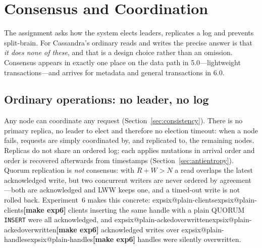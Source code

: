 \providecommand{\expsix}[1]{\ifcsname expsix@#1\endcsname\csname expsix@#1\endcsname\else\textbf{[make exp6]}\fi}
\providecommand{\expfault}[1]{\ifcsname expfault@#1\endcsname\csname expfault@#1\endcsname\else\textbf{[make figures]}\fi}

\section{Consensus and Coordination}\label{sec:consensus}

The assignment asks how the system elects leaders, replicates a log and prevents split-brain.
For Cassandra's ordinary reads and writes the precise answer is that \emph{it does none of
these}, and that is a design choice rather than an omission. Consensus appears in exactly one
place on the data path in 5.0---lightweight transactions---and arrives for metadata and
general transactions in 6.0.

\subsection{Ordinary operations: no leader, no log}

Any node can coordinate any request (Section~\ref{sec:consistency}). There is no primary
replica, no leader to elect and therefore no election timeout: when a node fails, requests are
simply coordinated by, and replicated to, the remaining nodes. Replicas do not share an ordered
log; each applies mutations in arrival order and order is recovered afterwards from
timestamps (Section~\ref{sec:antientropy}). Quorum replication is \emph{not} consensus: with
$R + W > N$ a read overlaps the latest acknowledged write, but two concurrent writers are
never ordered by agreement---both are acknowledged and LWW keeps one, and a timed-out write is
not rolled back. Experiment~6 makes this concrete: \expsix{plain-clients} clients inserting the
same handle with a plain QUORUM \texttt{INSERT} were all acknowledged, and
\expsix{plain-ackedoverwritten} acknowledged writes over \expsix{plain-handles} handles were
silently overwritten.

